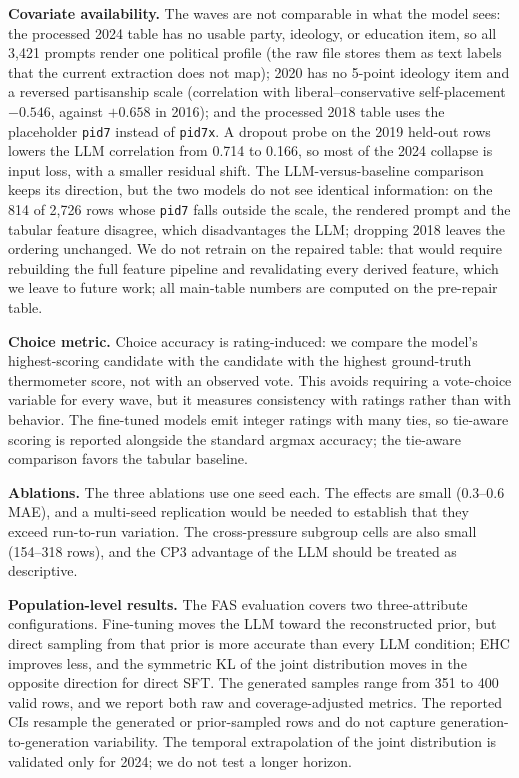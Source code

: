 \textbf{Covariate availability.} The waves are not comparable in what
the model sees: the processed 2024 table has no usable party, ideology,
or education item, so all 3,421 prompts render one political profile
(the raw file stores them as text labels that the current extraction
does not map); 2020 has no 5-point ideology item and a reversed
partisanship scale (correlation with liberal--conservative
self-placement \(-0.546\), against \(+0.658\) in 2016); and the
processed 2018 table uses the placeholder \texttt{pid7} instead of
\texttt{pid7x}. A dropout probe on the 2019 held-out rows lowers the LLM
correlation from 0.714 to 0.166, so most of the 2024 collapse is input
loss, with a smaller residual shift. The LLM-versus-baseline comparison
keeps its direction, but the two models do not see identical
information: on the 814 of 2,726 rows whose \texttt{pid7} falls outside
the scale, the rendered prompt and the tabular feature disagree, which
disadvantages the LLM; dropping 2018 leaves the ordering unchanged. We
do not retrain on the repaired table: that would require rebuilding the
full feature pipeline and revalidating every derived feature, which we
leave to future work; all main-table numbers are computed on the
pre-repair table.

\textbf{Choice metric.} Choice accuracy is rating-induced: we compare
the model's highest-scoring candidate with the candidate with the
highest ground-truth thermometer score, not with an observed vote. This
avoids requiring a vote-choice variable for every wave, but it measures
consistency with ratings rather than with behavior. The fine-tuned
models emit integer ratings with many ties, so tie-aware scoring is
reported alongside the standard argmax accuracy; the tie-aware
comparison favors the tabular baseline.

\textbf{Ablations.} The three ablations use one seed each. The effects
are small (0.3--0.6 MAE), and a multi-seed replication would be needed
to establish that they exceed run-to-run variation. The cross-pressure
subgroup cells are also small (154--318 rows), and the CP3 advantage of
the LLM should be treated as descriptive.

\textbf{Population-level results.} The FAS evaluation covers two
three-attribute configurations. Fine-tuning moves the LLM toward the
reconstructed prior, but direct sampling from that prior is more
accurate than every LLM condition; EHC improves less, and the symmetric
KL of the joint distribution moves in the opposite direction for direct
SFT. The generated samples range from 351 to 400 valid rows, and we
report both raw and coverage-adjusted metrics. The reported CIs resample
the generated or prior-sampled rows and do not capture
generation-to-generation variability. The temporal extrapolation of the
joint distribution is validated only for 2024; we do not test a longer
horizon.

